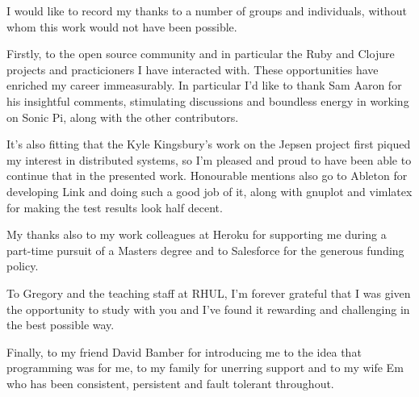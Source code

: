 \documentclass[11pt]{article} %
\theoremstyle{plain}
\theoremstyle{definition}
\begin{document}
I would like to record my thanks to a number of groups and individuals, without
whom this work would not have been possible.

Firstly, to the open source community and in particular the Ruby and Clojure
projects and practicioners I have interacted with. These opportunities have
enriched my career immeasurably. In particular I'd like to thank Sam Aaron for
his insightful comments, stimulating discussions and boundless energy in
working on Sonic Pi, along with the other contributors.

It's also fitting that the Kyle Kingsbury's work on the Jepsen project first
piqued my interest in distributed systems, so I'm pleased and proud to have
been able to continue that in the presented work. Honourable mentions also go
to Ableton for developing Link and doing such a good job of it, along with
gnuplot and vimlatex for making the test results look half decent.

My thanks also to my work colleagues at Heroku for supporting me during a
part-time pursuit of a Masters degree and to Salesforce for the generous
funding policy.

To Gregory and the teaching staff at RHUL, I'm forever grateful that I was
given the opportunity to study with you and I've found it rewarding and
challenging in the best possible way.

Finally, to my friend David Bamber for introducing me to the idea that
programming was for me, to my family for unerring support and to my wife Em who
has been consistent, persistent and fault tolerant throughout.
\end{document}
